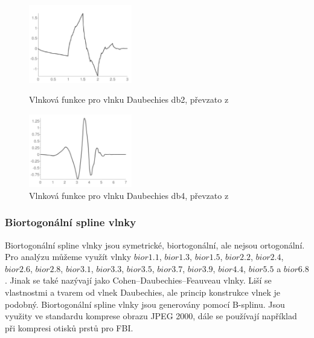 \begin{figure}[!htbp]
  \begin{minipage}[b]{0.5\linewidth}
    \centering
    \includegraphics[width=170px]{obrazky-figures/db2wavelet.PNG}
    \caption{Vlnková funkce pro vlnku Daubechies db2, převzato z \cite{PyWaveletsBrowser}}
  \end{minipage}
  \hspace{0.5cm}
  \begin{minipage}[b]{0.5\linewidth}
    \centering
    \includegraphics[width=170px]{obrazky-figures/db4wavelet.PNG}
    \caption{Vlnková funkce pro vlnku Daubechies db4, převzato z \cite{PyWaveletsBrowser}}
  \end{minipage}
\end{figure}
    
\subsubsection{Biortogonální spline vlnky}
Biortogonální spline vlnky jsou symetrické, biortogonální, ale nejsou ortogonální. Pro analýzu můžeme využít vlnky $bior1.1$, $bior1.3$, $bior1.5$, $bior2.2$, $bior2.4$, $bior2.6$, $bior2.8$, $bior 3.1$, $bior3.3$, $bior3.5$, $bior3.7$, $bior3.9$, $bior4.4$, $bior5.5$ a $bior6.8$.\cite{PyWaveletsBrowser} Jinak se také nazývají jako Cohen–Daubechies–Feauveau vlnky. Liší se vlastnostmi a tvarem od vlnek Daubechies, ale princip konstrukce vlnek je podobný. Biortogonální spline vlnky jsou generovány pomocí B-splinu. \cite{GeneralizedBiorthogonalDaubechiesWavelets} Jsou využity ve standardu komprese obrazu JPEG 2000, dále se používají například při kompresi otisků prstů pro FBI. 


